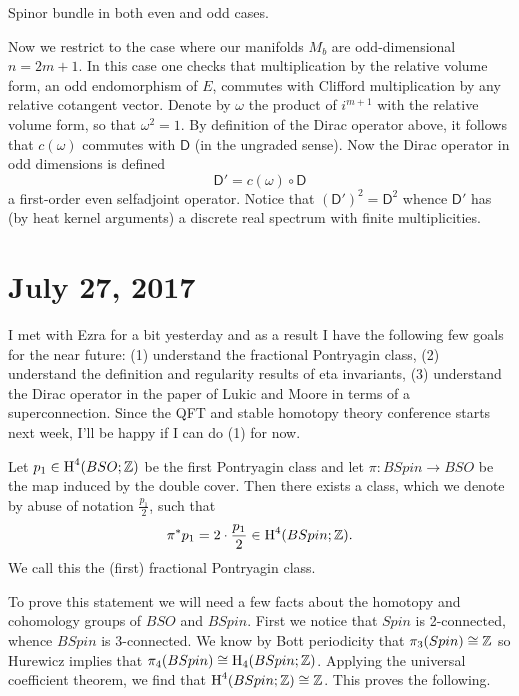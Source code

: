 \documentclass{amsart}
\renewcommand\d{\mathsf{D}}
\begin{document}
\begin{example}
    Spinor bundle in both even and odd cases.
\end{example}
Now we restrict to the case where our manifolds $M_b$ are odd-dimensional $n=2m+1$. In this case
one checks that multiplication by the relative volume form, an odd endomorphism of $E$,
commutes with Clifford multiplication by any relative cotangent vector. Denote by $\omega$
the product of $i^{m+1}$ with the relative volume form, so that $\omega^2=1$. By definition
of the Dirac operator above, it follows that $c(\omega)$ commutes with $\d$ (in the ungraded
sense). Now the Dirac operator in odd dimensions is defined
\begin{equation*}
    \d'=c(\omega)\circ \d
\end{equation*}
a first-order even selfadjoint operator. Notice that $(\d')^2 = \d^2$ whence $\d'$ has
(by heat kernel arguments) a discrete real spectrum with finite multiplicities.

\section{July 27, 2017}

I met with Ezra for a bit yesterday and as a result I have the following few goals for the
near future: (1) understand the fractional Pontryagin class, (2) understand the definition
and regularity results of eta invariants, (3) understand the Dirac operator in the paper
of Lukic and Moore in terms of a superconnection. Since the QFT and stable homotopy theory
conference starts next week, I'll be happy if I can do (1) for now.

\begin{proposition}
    Let $p_1\in\operatorname{H}^4(BSO;\mathbb{Z})$ be the first Pontryagin class and let $\pi: BSpin\to BSO$
    be the map induced by the double cover. Then there exists a class, which we denote
    by abuse of notation $\frac{p_1}{2}$, such that
    \begin{equation*}
        \pi^*p_1 = 2\cdot \frac{p_1}{2} \in \operatorname{H}^4(BSpin;\mathbb{Z}).
    \end{equation*}
    We call this the (first) fractional Pontryagin class.
\end{proposition}

To prove this statement we will need a few facts about the homotopy and cohomology groups of
$BSO$ and $BSpin$. First we notice that $Spin$ is 2-connected, whence $BSpin$ is 3-connected.
We know by Bott periodicity that $\pi_3(Spin)\cong\mathbb{Z}$ so Hurewicz implies that
$\pi_4(BSpin)\cong \operatorname{H}_4(BSpin;\mathbb{Z})$. Applying the universal coefficient theorem, we find that
$\operatorname{H}^4(BSpin;\mathbb{Z})\cong\mathbb{Z}$. This proves the following.
\end{document}

